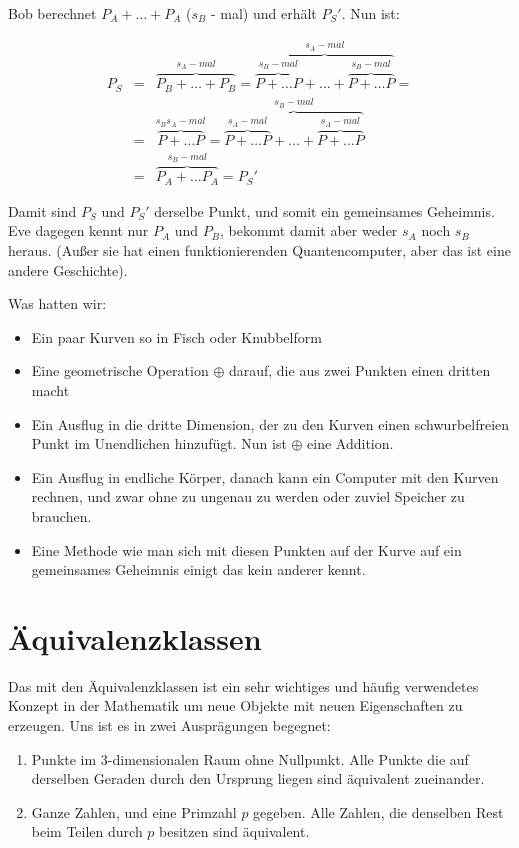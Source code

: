 \documentclass{article}
\begin{document}
Bob berechnet $P_A + \ldots + P_A$ ($s_B$ - mal) und erhält $P_S'$. Nun ist:

\begin{eqnarray*}
  P_S &=& \overbrace{P_B + \ldots + P_B}^{s_A-mal} =
  \overbrace{\overbrace{P + \ldots P}^{s_B-mal} + \ldots +
  \overbrace{P + \ldots P}^{s_B-mal}}^{s_A-mal} = \\
  &=& \overbrace{P + \ldots P}^{s_Bs_A-mal} =
  \overbrace{\overbrace{P + \ldots P}^{s_A-mal} + \ldots +
  \overbrace{P + \ldots P}^{s_A-mal}}^{s_B-mal} \\
  &=& \overbrace{P_A + \ldots P_A}^{s_B-mal} = P_S'
\end{eqnarray*}

Damit sind $P_S$ und $P_S'$ derselbe Punkt, und somit ein gemeinsames
Geheimnis. Eve dagegen kennt nur $P_A$ und $P_B$, bekommt damit aber weder
$s_A$ noch $s_B$ heraus. (Außer sie hat einen funktionierenden
Quantencomputer, aber das ist eine andere Geschichte).

Was hatten wir:

\begin{itemize}
\item Ein paar Kurven so in Fisch oder Knubbelform
\item Eine geometrische Operation $\oplus$ darauf, die aus zwei Punkten einen
  dritten macht
\item Ein Ausflug in die dritte Dimension, der zu den Kurven einen
  schwurbelfreien Punkt im Unendlichen hinzufügt. Nun ist $\oplus$ eine
  Addition.
\item Ein Ausflug in endliche Körper, danach kann ein Computer mit den
  Kurven rechnen, und zwar ohne zu ungenau zu werden oder zuviel
  Speicher zu brauchen.
\item Eine Methode wie man sich mit diesen Punkten auf der Kurve auf ein
  gemeinsames Geheimnis einigt das kein anderer kennt.
\end{itemize}

\section{Äquivalenzklassen}
Das mit den Äquivalenzklassen ist ein sehr wichtiges und häufig verwendetes
Konzept in der Mathematik um neue Objekte mit neuen Eigenschaften zu
erzeugen. Uns ist es in zwei Ausprägungen begegnet:

\begin{enumerate}
\item Punkte im 3-dimensionalen Raum ohne Nullpunkt. Alle Punkte die auf derselben
   Geraden durch den Ursprung liegen sind äquivalent zueinander.
\item Ganze Zahlen, und eine Primzahl $p$ gegeben. Alle Zahlen, die denselben Rest
   beim Teilen durch $p$ besitzen sind äquivalent.
\end{enumerate}
\end{document}
